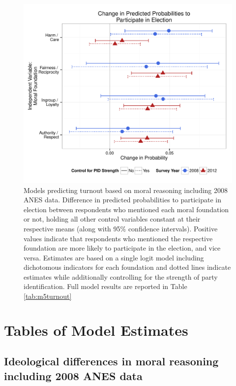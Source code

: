 \documentclass[12pt]{article}
\begin{document}
\begin{figure}[t]
  \centering
    \includegraphics[scale=.4]{../calc/fig/appD9turnout.pdf}
    \caption{Models predicting turnout based on moral reasoning including 2008 ANES data. Difference in predicted probabilities to participate in election between respondents who mentioned each moral foundation or not, holding all other control variables constant at their respective means (along with 95\% confidence intervals). Positive values indicate that respondents who mentioned the respective foundation are more likely to participate in the election, and vice versa. Estimates are based on a single logit model including dichotomous indicators for each foundation and dotted lines indicate estimates while additionally controlling for the strength of party identification. Full model results are reported in Table \ref{tab:m5turnout}}\label{fig:appD9turnout}
\end{figure}


\clearpage
\section{Tables of Model Estimates}\label{app:tables}
\renewcommand\thefigure{\thesection.\arabic{figure}}
\renewcommand\thetable{\thesection.\arabic{table}}
\setcounter{figure}{0}
\setcounter{table}{0}


\subsection{Ideological differences in moral reasoning including 2008 ANES data}
\end{document}
